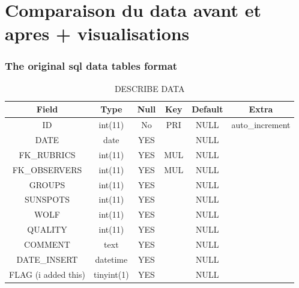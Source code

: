 \documentclass[12pt]{article}
\begin{document}
\section{Comparaison du data avant et apres + visualisations}

\subsubsection{The original sql data tables format}

\begin{table}[h!]
    \centering
    \caption{DESCRIBE DATA}
    \begin{tabular}{c|c|c|c|c|c}%
        \textbf{Field} & \textbf{Type} & \textbf{Null} & \textbf{Key} & \textbf{Default} & \textbf{Extra}  \\
        \hline
        ID & int(11) & No & PRI & NULL & auto\_increment \\
        
        DATE & date & YES && NULL & \\
        
        FK\_RUBRICS & int(11) & YES & MUL & NULL &  \\
        
        FK\_OBSERVERS & int(11) & YES & MUL & NULL &  \\
        
        GROUPS & int(11) & YES && NULL &  \\
        
        SUNSPOTS & int(11) & YES && NULL & \\
        
        WOLF & int(11) & YES && NULL &  \\
        
        QUALITY & int(11) & YES && NULL &  \\
        
        COMMENT & text & YES && NULL &  \\
        
        DATE\_INSERT & datetime & YES && NULL &  \\
        
        FLAG (i added this) & tinyint(1) & YES && NULL &  \\
        
    \end{tabular}
    \label{tab:data-og}
\end{table}
\end{document}
